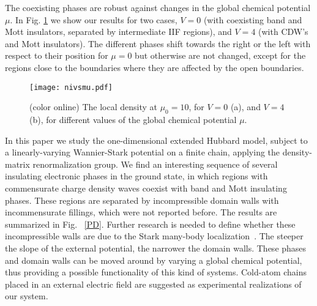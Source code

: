 \documentclass[aps,prl,showpacs,twocolumn,superscriptaddress]{revtex4-2}
\begin{document}

\vspace{0.2cm}

 The coexisting phases are robust against changes in the global chemical potential $\mu$. In Fig. \ref{HBmodif} we show our results for two cases, $V=0$ (with coexisting band and Mott insulators, separated by intermediate IIF regions), and $V=4$ (with CDW's and Mott insulators).
The different phases shift towards the right or the left with respect to their position for $\mu=0$ but otherwise are not changed, except for the regions close to the boundaries where they are affected by the open boundaries.




\begin{figure}[h]
\centering
\texttt{[image: nivsmu.pdf]}
\caption{(color online) The local density at $\mu^{}_0=10$, for $V=0$ (a), and $V=4$ (b), for different values of the global chemical potential $\mu$.}
\label{HBmodif}
\end{figure}


\vspace{0.2cm}

 In this paper we study the one-dimensional extended Hubbard model, subject to a linearly-varying Wannier-Stark  potential on a finite chain,  applying the density-matrix renormalization group. We find an interesting sequence of several insulating electronic phases in the ground state, in which regions with commensurate charge density waves coexist with band and Mott insulating phases. These regions are separated by incompressible domain walls with incommensurate fillings, which were not reported before. The results are summarized in Fig. ~\ref{PD}.
 Further research is needed to define whether these incompressible walls are due to the Stark many-body localization~\cite{moessner}.
The steeper the slope of the external potential, the narrower the domain walls. These phases and domain walls can be moved around by varying a global chemical potential, thus providing a possible functionality of this kind of systems. Cold-atom chains placed in an external electric field are suggested as experimental realizations of our system.
\end{document}

